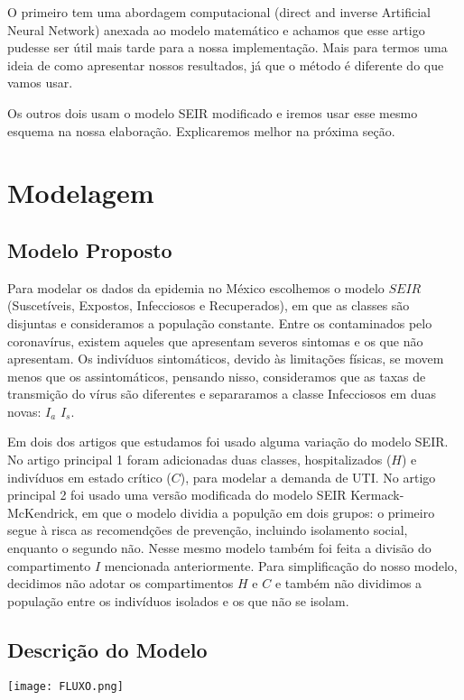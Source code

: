 \documentclass{article}
\begin{document}
O primeiro tem uma abordagem computacional (direct and inverse Artificial Neural Network) anexada ao modelo matemático e achamos que esse artigo pudesse ser útil mais tarde para a nossa implementação. Mais para termos uma ideia de como apresentar nossos resultados, já que o método é diferente do que vamos usar.

Os outros dois usam o modelo SEIR modificado e iremos usar esse mesmo esquema na nossa elaboração. Explicaremos melhor na próxima seção. 

\section{Modelagem}
\subsection{Modelo Proposto}
Para modelar os dados da epidemia no México escolhemos o modelo $SEIR$ (Suscetíveis, Expostos, Infecciosos e Recuperados), em que as classes são disjuntas e consideramos a população constante. Entre os contaminados pelo coronavírus, existem aqueles que apresentam severos sintomas e os que não apresentam. Os indivíduos sintomáticos, devido às limitações físicas, se movem menos que os assintomáticos, pensando nisso, consideramos que as taxas de transmição do vírus são diferentes e separaramos a classe Infecciosos em duas novas: $I_a$  $I_s$.

Em dois dos artigos que estudamos foi usado alguma variação do modelo SEIR. No artigo principal 1 foram adicionadas duas classes, hospitalizados ($H$) e indivíduos em estado crítico ($C$), para modelar a demanda de UTI.
No artigo principal 2 foi usado uma versão modificada do modelo SEIR Kermack-McKendrick, em que o modelo dividia a populção em dois grupos: o primeiro segue à risca as recomendções de prevenção, incluindo isolamento social, enquanto o segundo não. Nesse mesmo modelo também foi feita a divisão do compartimento $I$ mencionada anteriormente. Para simplificação do nosso modelo, decidimos não adotar os compartimentos $H$ e $C$ e também não dividimos a população entre os indivíduos isolados e os que não se isolam.

\subsection{Descrição do Modelo}

\texttt{[image: FLUXO.png]}
\end{document}
